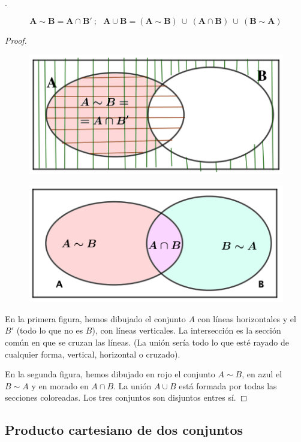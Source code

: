 \begin{theorem}
	. \vspace{-5mm} 
	
	\begin{small}
	$$\boxed{\boldsymbol{ A\sim B=A\cap B'}}\ ; \ \ \ \boxed{\boldsymbol{A\cup B=(A\sim B) \ \cup \ (A\cap B) \ \cup \ (B\sim A)}}$$ \end{small}
\end{theorem}

\begin{proof}

\begin{multicols}{2}
	\begin{figure}[H]
	\centering
	\includegraphics[width=.45\textwidth]{imagenes/apendices/app05.png}
	\end{figure}
	\begin{figure}[H]
	\centering
	\includegraphics[width=.45\textwidth]{imagenes/apendices/app06.png}
	\end{figure}
\end{multicols}	

En la primera figura, hemos dibujado el conjunto $A$ con líneas horizontales y el $B'$ (todo lo que no es $B$), con líneas verticales. La intersección es la sección común en que se cruzan las líneas. (La unión sería todo lo que esté rayado de cualquier forma, vertical, horizontal o cruzado).

En la segunda figura, hemos dibujado en rojo el conjunto $A\sim B$, en azul el $B\sim A$ y en morado en $A\cap B$. La unión $A\cup B$ está formada por todas las secciones coloreadas. \textcolor{gris}{Los tres conjuntos son disjuntos entres sí.}
\end{proof}

\subsection{Producto cartesiano de dos conjuntos}

